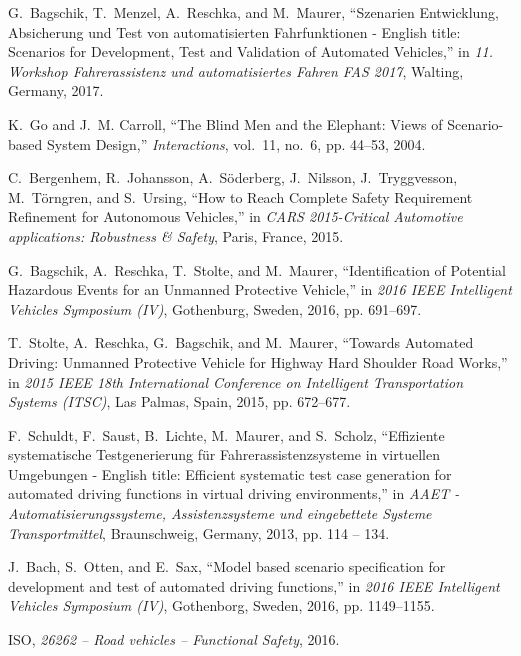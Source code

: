 \documentclass[conference]{IEEEtranch}
\begin{document}
\begin{thebibliography}{10}
	G.~Bagschik, T.~Menzel, A.~Reschka, and M.~Maurer, ``{Szenarien
		Entwicklung, Absicherung und Test von automatisierten Fahrfunktionen -
		English title: Scenarios for Development, Test and Validation of Automated
		Vehicles},'' in \emph{11. {Workshop} {Fahrerassistenz und automatisiertes
			Fahren} {FAS} 2017}, Walting, Germany, 2017.
	
	K.~Go and J.~M. Carroll, ``The {Blind} {Men} and the {Elephant}: {Views} of
	{Scenario}-based {System} {Design},'' \emph{Interactions}, vol.~11, no.~6,
	pp. 44--53, 2004.
	
	C.~Bergenhem, R.~Johansson, A.~S\"oderberg, J.~Nilsson, J.~Tryggvesson,
	M.~T\"orngren, and S.~Ursing, ``How to {Reach} {Complete} {Safety}
	{Requirement} {Refinement} for {Autonomous} {Vehicles},'' in \emph{{CARS}
		2015-{Critical} {Automotive} applications: {Robustness} \& {Safety}}, Paris,
	France, 2015.
	
	G.~Bagschik, A.~Reschka, T.~Stolte, and M.~Maurer, ``Identification of
	{P}otential {H}azardous {E}vents for an {Unmanned} {Protective} {Vehicle},''
	in \emph{2016 {IEEE} {Intelligent} {Vehicles} {Symposium} ({IV})},
	Gothenburg, Sweden, 2016, pp. 691--697.
	
	T.~Stolte, A.~Reschka, G.~Bagschik, and M.~Maurer, ``Towards {Automated}
	{Driving}: {Unmanned} {Protective} {Vehicle} for {Highway} {Hard} {Shoulder}
	{Road} {Works},'' in \emph{2015 {IEEE} 18th {International} {Conference} on
		{Intelligent} {Transportation} {Systems} ({ITSC})}, Las Palmas, Spain, 2015,
	pp. 672--677.
	
	F.~Schuldt, F.~Saust, B.~Lichte, M.~Maurer, and S.~Scholz, ``{Effiziente
		systematische Testgenerierung f\"ur Fahrerassistenzsysteme in virtuellen
		Umgebungen - English title: Efficient systematic test case generation for
		automated driving functions in virtual driving environments},'' in \emph{AAET
		- Automatisierungssysteme, Assistenzsysteme und eingebettete Systeme
		Transportmittel}, Braunschweig, Germany, 2013, pp. 114 -- 134.
	
	J.~Bach, S.~Otten, and E.~Sax, ``Model based scenario specification for
	development and test of automated driving functions,'' in \emph{2016 {IEEE}
		{Intelligent} {Vehicles} {Symposium} ({IV})}, Gothenborg, Sweden, 2016, pp.
	1149--1155.
	
	ISO, \emph{26262 -- Road vehicles -- Functional Safety}, 2016.
	

\end{thebibliography}
\end{document}
